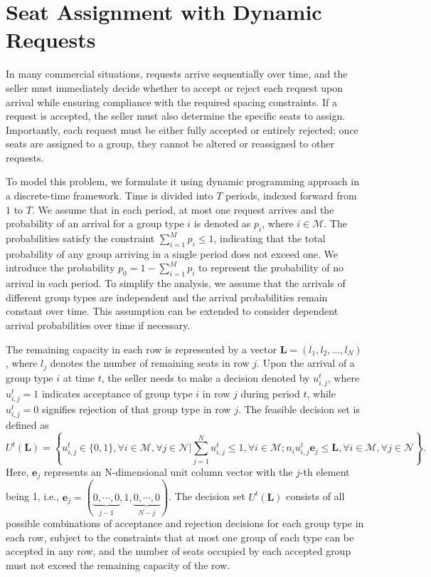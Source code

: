 \section{Seat Assignment with Dynamic Requests}\label{sec_dynamic_seat}

In many commercial situations, requests arrive sequentially over time, and the seller must immediately decide whether to accept or reject each request upon arrival while ensuring compliance with the required spacing constraints. If a request is accepted, the seller must also determine the specific seats to assign. Importantly, each request must be either fully accepted or entirely rejected; once seats are assigned to a group, they cannot be altered or reassigned to other requests.

To model this problem, we formulate it using dynamic programming approach in a discrete-time framework. Time is divided into $T$ periods, indexed forward from $1$ to $T$. We assume that in each period, at most one request arrives and the probability of an arrival for a group type $i$ is denoted as $p_i$, where $i \in \mathcal{M}$. The probabilities satisfy the constraint $\sum_{i=1}^M p_i \leq 1$, indicating that the total probability of any group arriving in a single period does not exceed one. We introduce the probability $p_0 = 1 - \sum_{i=1}^{M} p_i$ to represent the probability of no arrival in each period. To simplify the analysis, we assume that the arrivals of different group types are independent and the arrival probabilities remain constant over time. This assumption can be extended to consider dependent arrival probabilities over time if necessary.

The remaining capacity in each row is represented by a vector $\mathbf{L} = (l_1, l_2, \ldots, l_N)$, where $l_j$ denotes the number of remaining seats in row $j$. Upon the arrival of a group type $i$ at time $t$, the seller needs to make a decision denoted by $u_{i,j}^{t}$, where $u_{i,j}^{t} = 1$ indicates acceptance of group type $i$ in row $j$ during period $t$, while $u_{i,j}^{t} = 0$ signifies rejection of that group type in row $j$. The feasible decision set is defined as $$U^{t}(\mathbf{L}) = \left\{u_{i,j}^{t} \in \{0,1\}, \forall i \in \mathcal{M}, \forall j \in \mathcal{N} \big| \sum_{j=1}^{N} u_{i,j}^{t} \leq 1, \forall i \in \mathcal{M}; n_{i}u_{i,j}^{t}\mathbf{e}_j \leq \mathbf{L}, \forall i \in \mathcal{M}, \forall j \in \mathcal{N}\right\}.$$
Here, $\mathbf{e}_j$ represents an N-dimensional unit column vector with the $j$-th element being 1, i.e., $\mathbf{e}_j = (\underbrace{0, \cdots, 0}_{j-1}, 1, \underbrace{0, \cdots, 0}_{N-j})$. The decision set $U^{t}(\mathbf{L})$ consists of all possible combinations of acceptance and rejection decisions for each group type in each row, subject to the constraints that at most one group of each type can be accepted in any row, and the number of seats occupied by each accepted group must not exceed the remaining capacity of the row.

